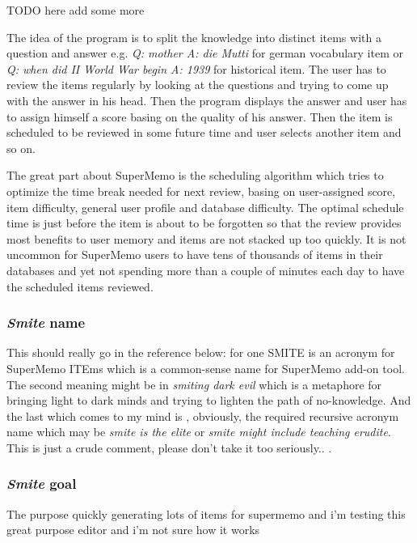 \documentclass[a4paper,11pt]{article}
\newcommand{\smite}{\emph{\textbf{Smite{}}}}
\begin{document}
TODO here add some more

The idea of the program is to split the knowledge into distinct items with a
question and answer e.g. \emph{Q: mother A: die Mutti} for german vocabulary
item or \emph{Q: when did II World War begin A: 1939} for historical item.  The
user has to review the items regularly by looking at the questions and trying
to come up with the answer in his head. Then the program displays the answer
and user has to assign himself a score basing on the quality of his answer.
Then the item is scheduled to be reviewed in some future time and user selects
another item and so on.

The great part about SuperMemo is the scheduling algorithm which tries to
optimize the time break needed for next review, basing on user-assigned score,
item difficulty, general user profile and database difficulty. The optimal
schedule time is just before the item is about to be forgotten so that the
review provides most benefits to user memory and items are not stacked up too
quickly.  It is not uncommon for SuperMemo users to have tens of thousands of
items in their databases and yet not spending more than a couple of minutes
each day to have the scheduled items reviewed.

\subsubsection{\smite{} name}

This should really go in the reference below: for one SMITE is an acronym for
SuperMemo ITEms which is a common-sense name for SuperMemo add-on tool.  The
second meaning might be in \emph{smiting dark evil} which is a metaphore for
bringing light to dark minds and trying to lighten the path of no-knowledge.
And the last which comes to my mind is , obviously, the required recursive
acronym name which may be \emph{smite is the elite} or \emph{smite might
include teaching erudite}.  This is just a crude comment, please don't take it
too seriously.. .










\subsubsection{\smite{} goal}

The purpose quickly generating lots of items for supermemo  and i'm testing
this great purpose editor and i'm not sure how it works
\end{document}
